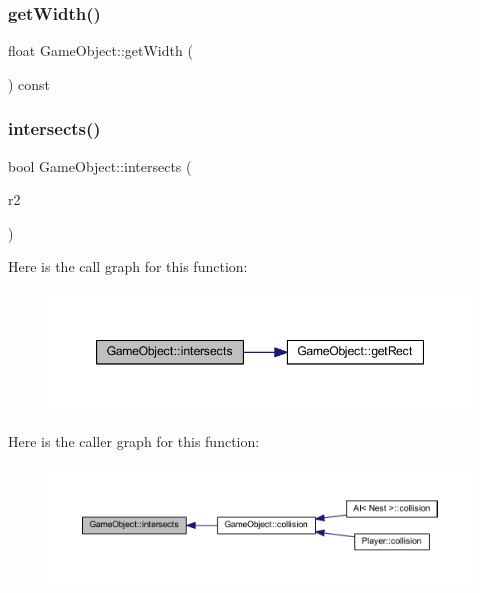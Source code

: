 \mbox{\label{class_game_object_a665147ee46e9b62442b2d6b9835c4dd4}} 
\subsubsection{\texorpdfstring{get\+Width()}{getWidth()}}
{\footnotesize\ttfamily float Game\+Object\+::get\+Width (\begin{DoxyParamCaption}{ }\end{DoxyParamCaption}) const}

\mbox{\label{class_game_object_a7c189644b6b5810c117a4e2654fbc752}} 
\subsubsection{\texorpdfstring{intersects()}{intersects()}}
{\footnotesize\ttfamily bool Game\+Object\+::intersects (\begin{DoxyParamCaption}\item[{const sf\+::\+Float\+Rect \&}]{r2 }\end{DoxyParamCaption})}

Here is the call graph for this function\+:
\nopagebreak
\begin{figure}[H]
\begin{center}
\leavevmode
\includegraphics[width=347pt]{class_game_object_a7c189644b6b5810c117a4e2654fbc752_cgraph}
\end{center}
\end{figure}
Here is the caller graph for this function\+:
\nopagebreak
\begin{figure}[H]
\begin{center}
\leavevmode
\includegraphics[width=350pt]{class_game_object_a7c189644b6b5810c117a4e2654fbc752_icgraph}
\end{center}
\end{figure}
\mbox{\label{class_game_object_abebe08f70e334c52b8bf052b6ef8c6f3}} 
